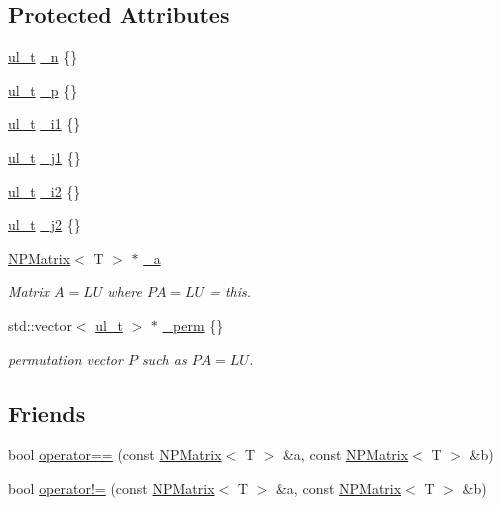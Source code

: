 \subsection*{Protected Attributes}
\begin{DoxyCompactItemize}
\item 
\mbox{\hyperlink{typedef_8h_a1b140a2034db3f5dfe18a987745df43a}{ul\+\_\+t}} \mbox{\hyperlink{class_n_p_matrix_a6ead143a6f35fc3247c26c2442841ba9}{\+\_\+n}} \{\}
\item 
\mbox{\hyperlink{typedef_8h_a1b140a2034db3f5dfe18a987745df43a}{ul\+\_\+t}} \mbox{\hyperlink{class_n_p_matrix_aa1571de5d091b0b2e71fd665da3eb7e1}{\+\_\+p}} \{\}
\item 
\mbox{\hyperlink{typedef_8h_a1b140a2034db3f5dfe18a987745df43a}{ul\+\_\+t}} \mbox{\hyperlink{class_n_p_matrix_a0cae48bb6660c2d00136ce8600d0fc28}{\+\_\+i1}} \{\}
\item 
\mbox{\hyperlink{typedef_8h_a1b140a2034db3f5dfe18a987745df43a}{ul\+\_\+t}} \mbox{\hyperlink{class_n_p_matrix_aa95383d682a70d44dc268164c46c2e1f}{\+\_\+j1}} \{\}
\item 
\mbox{\hyperlink{typedef_8h_a1b140a2034db3f5dfe18a987745df43a}{ul\+\_\+t}} \mbox{\hyperlink{class_n_p_matrix_a232044cf8aba4ad59c69c465822aed59}{\+\_\+i2}} \{\}
\item 
\mbox{\hyperlink{typedef_8h_a1b140a2034db3f5dfe18a987745df43a}{ul\+\_\+t}} \mbox{\hyperlink{class_n_p_matrix_ad5307914390ebfd2e7760146bd10d8d4}{\+\_\+j2}} \{\}
\item 
\mbox{\hyperlink{class_n_p_matrix}{N\+P\+Matrix}}$<$ T $>$ $\ast$ \mbox{\hyperlink{class_n_p_matrix_aef296b7e9a4688acd83e0cf2d9e5dfef}{\+\_\+a}}
\begin{DoxyCompactList}\small\item\em Matrix $ A = LU $ where $ PA = LU $ = this. \end{DoxyCompactList}\item 
std\+::vector$<$ \mbox{\hyperlink{typedef_8h_a1b140a2034db3f5dfe18a987745df43a}{ul\+\_\+t}} $>$ $\ast$ \mbox{\hyperlink{class_n_p_matrix_adae969b094e97895a62412765b50fb6f}{\+\_\+perm}} \{\}
\begin{DoxyCompactList}\small\item\em permutation vector $ P $ such as $ PA = LU $. \end{DoxyCompactList}\end{DoxyCompactItemize}
\subsection*{Friends}
\begin{DoxyCompactItemize}
\item 
bool \mbox{\hyperlink{class_n_p_matrix_a8b906fe5547a2234430316ccfed4b98a}{operator==}} (const \mbox{\hyperlink{class_n_p_matrix}{N\+P\+Matrix}}$<$ T $>$ \&a, const \mbox{\hyperlink{class_n_p_matrix}{N\+P\+Matrix}}$<$ T $>$ \&b)
\item 
bool \mbox{\hyperlink{class_n_p_matrix_a04301fcca6baa720c7a10c61bdee2645}{operator!=}} (const \mbox{\hyperlink{class_n_p_matrix}{N\+P\+Matrix}}$<$ T $>$ \&a, const \mbox{\hyperlink{class_n_p_matrix}{N\+P\+Matrix}}$<$ T $>$ \&b)
\end{DoxyCompactItemize}
